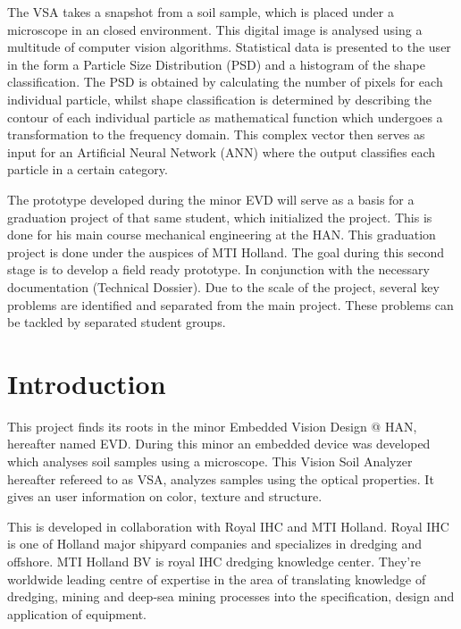 \documentclass[11pt,fleqn,,a4paper,twoside,openright]{book}
\begin{document}
The VSA takes a snapshot from a soil sample, which is placed under a microscope in an closed environment. This digital image is analysed using a multitude of computer vision algorithms. Statistical data is presented to the user in the form a Particle Size Distribution (PSD) and a histogram of the shape classification. The PSD is obtained by calculating the number of pixels for each individual particle, whilst shape classification is determined by describing the contour of each individual particle as mathematical function which undergoes a transformation to the frequency domain. This complex vector then serves as input for an Artificial Neural Network (ANN) where the output classifies each particle in a certain category.

The prototype developed during the minor EVD will serve as a basis for a graduation project of that same student, which initialized the project. This is done for his main course mechanical engineering at the HAN. This graduation project is done under the auspices of MTI Holland. The goal during this second stage is to develop a field ready prototype. In conjunction with the necessary documentation (Technical Dossier). 
Due to the scale of the project, several key problems are identified and separated from the main project. These problems can be tackled by separated student groups.

\tableofcontents %

\cleardoublepage %

\pagestyle{fancy} %

\chapter{Introduction}
This project finds its roots in the minor Embedded Vision Design @ HAN, hereafter named EVD. During this minor an embedded device was developed which analyses soil samples using a microscope. This Vision Soil Analyzer hereafter refereed to as VSA, analyzes samples using the optical properties. It gives an user information on color, texture and structure.

This is developed in collaboration with Royal IHC and MTI Holland. Royal IHC is one of Holland major shipyard companies and specializes in dredging and offshore. MTI Holland BV is royal IHC dredging knowledge center. They're worldwide leading centre of expertise in the area of translating knowledge of dredging, mining and deep-sea mining processes into the specification, design and application of equipment.
\end{document}
